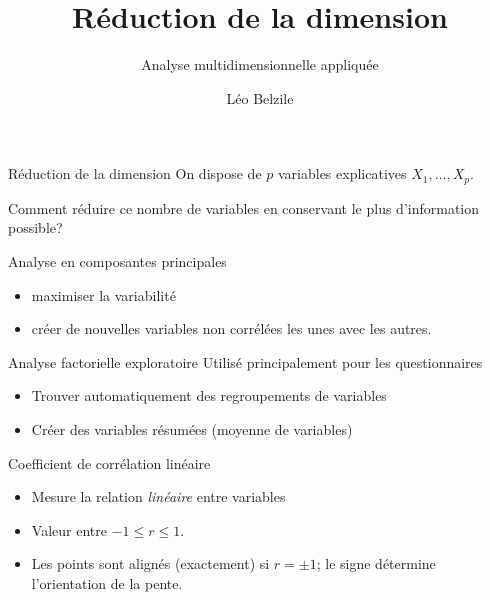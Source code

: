 \documentclass[
  ignorenonframetext,
]{beamer}
\title{Réduction de la dimension}
\subtitle{Analyse multidimensionnelle appliquée}
\author{Léo Belzile}
\date{}
\institute{HEC Montréal}
\providecommand{\tightlist}{%
  \setlength{\itemsep}{0pt}\setlength{\parskip}{0pt}}\usepackage{longtable,booktabs,array}
\begin{document}
\frame{\titlepage}
\ifdefined\Shaded\renewenvironment{Shaded}{\begin{tcolorbox}[frame hidden, boxrule=0pt, breakable, sharp corners, enhanced, borderline west={3pt}{0pt}{shadecolor}, interior hidden]}{\end{tcolorbox}}\fi

\begin{frame}{Réduction de la dimension}
\protect\hypertarget{ruxe9duction-de-la-dimension}{}
On dispose de \(p\) variables explicatives \(X_1, \ldots, X_p\).

Comment réduire ce nombre de variables en conservant le plus
d'information possible?
\end{frame}

\begin{frame}{Analyse en composantes principales}
\protect\hypertarget{analyse-en-composantes-principales}{}
\begin{itemize}
\tightlist
\item
  maximiser la variabilité
\item
  créer de nouvelles variables non corrélées les unes avec les autres.
\end{itemize}
\end{frame}

\begin{frame}{Analyse factorielle exploratoire}
\protect\hypertarget{analyse-factorielle-exploratoire}{}
Utilisé principalement pour les questionnaires

\begin{itemize}
\tightlist
\item
  Trouver automatiquement des regroupements de variables
\item
  Créer des variables résumées (moyenne de variables)
\end{itemize}
\end{frame}

\begin{frame}{Coefficient de corrélation linéaire}
\protect\hypertarget{coefficient-de-corruxe9lation-linuxe9aire}{}
\begin{itemize}
\tightlist
\item
  Mesure la relation \emph{linéaire} entre variables
\item
  Valeur entre \(-1 \leq r \leq 1\).
\item
  Les points sont alignés (exactement) si \(r=\pm 1\); le signe
  détermine l'orientation de la pente.
\end{itemize}
\end{frame}
\end{document}

